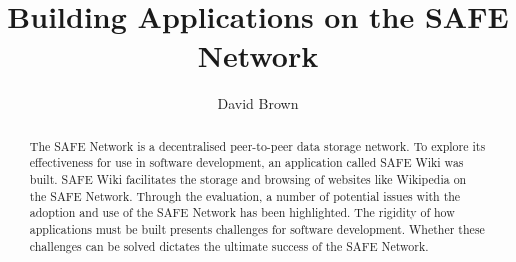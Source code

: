 \documentclass{l4proj}
\begin{document}
\title{Building Applications on the SAFE Network}
\author{David Brown}
\maketitle

\begin{abstract}

The SAFE Network is a decentralised peer-to-peer data storage network. To explore its effectiveness for use in software development, an application called SAFE Wiki was built. SAFE Wiki facilitates the storage and browsing of websites like Wikipedia on the SAFE Network. Through the evaluation, a number of potential issues with the adoption and use of the SAFE Network has been highlighted. The rigidity of how applications must be built presents challenges for software development. Whether these challenges can be solved dictates the ultimate success of the SAFE Network.

\end{abstract}

\educationalconsent

\tableofcontents








\printbibliography
\end{document}
